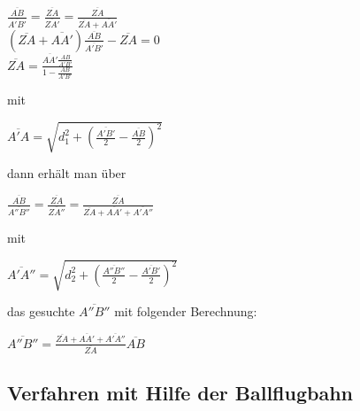 \documentclass{ezb}
\begin{document}
\begin{center}
$\frac{\overline{AB}}{\overline{A'B'}} = \frac{\overline{ZA}}{\overline{ZA'}} = \frac{\overline{ZA}}{\overline{ZA}+\overline{AA'}}$\\
$(\overline{ZA}+\overline{AA'})\frac{\overline{AB}}{\overline{A'B'}}-\overline{ZA}=0$\\
$\overline{ZA}=\frac{\overline{AA'}\frac{AB}{A'B'}}{1-\frac{AB}{A'B'}}$
\end{center}
mit
\begin{center}
$\overline{A'A} = \sqrt{d_{1}^{2}+(\frac{\overline{A'B'}}{2}-\frac{\overline{AB}}{{2}})^{2}}$\\
\end{center}
dann erhält man über
\begin{center}
$\frac{\overline{AB}}{\overline{A''B''}} = \frac{\overline{ZA}}{\overline{ZA''}} = \frac{\overline{ZA}}{\overline{ZA}+\overline{AA'}+\overline{A'A''}} $\\
\end{center}
mit
\begin{center}
$\overline{A'A''} = \sqrt{d_{2}^{2}+(\frac{\overline{A''B''}}{2}-\frac{\overline{A'B'}}{{2}})^{2}}$\\
\end{center}
das gesuchte $\overline{A''B''}$ mit folgender Berechnung:\\
\begin{center}
$\overline{A''B''} = \frac{\overline{ZA}+\overline{AA'}+\overline{A'A''}}{\overline{ZA}}\overline{AB}$
\end{center}
\subsection{Verfahren mit Hilfe der Ballflugbahn}
\end{document}
